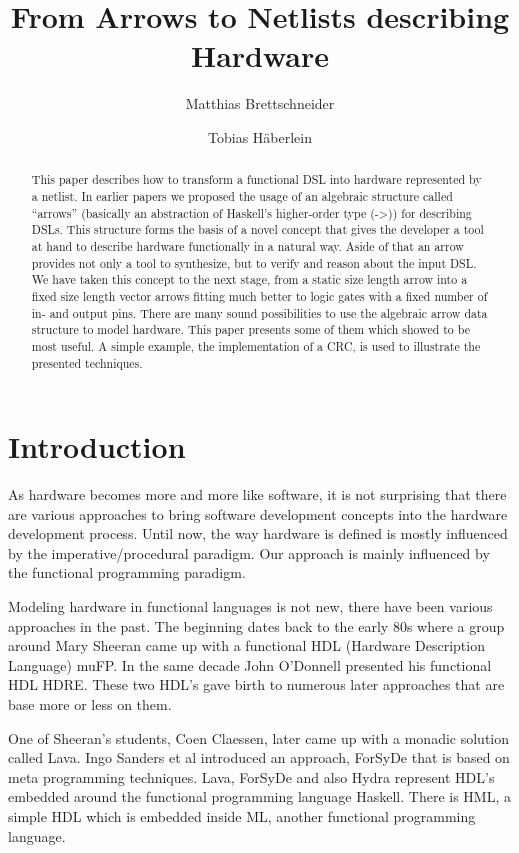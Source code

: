 \documentclass[a4paper,UKenglish]{lipics}
\title{From Arrows to Netlists describing Hardware}
\author[1]{Matthias Brettschneider}
\author[2]{Tobias Häberlein}
\affil[1]{University of Applied Science  \\ Albstadt - Sigmaringen \\ brettschneider@hs-albsig.de}
\affil[2]{University of Applied Science  \\ Albstadt - Sigmaringen \\ haeberlein@hs-albsig.de}
\begin{document}
\maketitle


\begin{abstract}
This paper describes how to transform a functional DSL into hardware represented by a netlist. In earlier papers we proposed the
usage of an algebraic structure called ``arrows'' (basically an abstraction of Haskell's higher-order type (->)) for describing
DSLs. This structure forms the basis of a novel concept that gives the developer a tool at hand to describe hardware functionally
in a natural way. Aside of that an arrow provides not only a tool to synthesize, but to verify and reason about the input DSL. We
have taken this concept to the next stage, from a static size length arrow into a fixed size length vector arrows fitting much
better to logic gates with a fixed number of in- and output pins. There are many sound possibilities to use the algebraic arrow
data structure to model hardware. This paper presents some of them which showed to be most useful. A simple example, the
implementation of a CRC, is used to illustrate the presented techniques.
\end{abstract}


\section{Introduction}
\label{recent_approaches}
As hardware becomes more and more like software, it is not surprising that there are various approaches to bring software
development concepts into the hardware development process. Until now, the way hardware is defined is mostly influenced by the
imperative/procedural paradigm. Our approach is mainly influenced by the functional programming paradigm.

\par
Modeling hardware in functional languages is not new, there have been various approaches in the past. The beginning dates back to
the early 80s where a group around Mary Sheeran came up with a functional HDL (Hardware Description Language)
muFP\cite{sheeran:muFP}. In the same decade John O'Donnell presented his functional HDL HDRE\cite{hydra:old,donnell}. These two
HDL's gave birth to numerous later approaches that are base more or less on them.

\par
One of Sheeran's students, Coen Claessen, later came up with a monadic solution called Lava\cite{claessen:hardware}. Ingo Sanders
et al introduced an approach, ForSyDe \cite{forsyde:phd,forsyde:ieee} that is based on meta programming techniques. Lava, ForSyDe
and also Hydra \cite{donnell} represent HDL's embedded around the functional programming language Haskell. There is HML\cite{hml},
a simple HDL which is embedded inside ML, another functional programming language.
\end{document}
